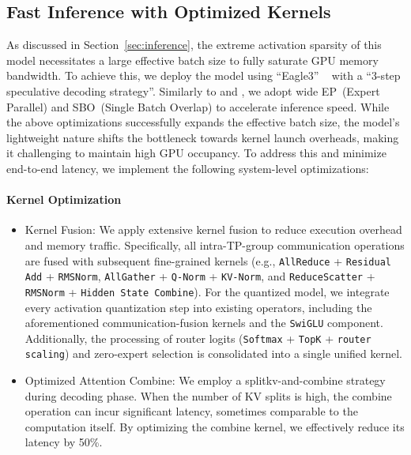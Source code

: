 \documentclass{article}
\begin{document}
\subsection{Fast Inference with Optimized Kernels}


As discussed in Section~\ref{sec:inference}, the extreme activation sparsity of this model necessitates a large effective batch size to fully saturate GPU memory bandwidth. To achieve this, we deploy the model using ``Eagle3'' ~\citep{li2025eagle3scalinginferenceacceleration} with a ``3-step speculative decoding strategy''. Similarly to \cite{qian2025epsmoeexpertpipelinescheduler} and \cite{meituanlongcatteam2025longcatflashtechnicalreport}, we adopt wide EP~(Expert Parallel) and SBO~(Single Batch Overlap) to accelerate inference speed. While the above optimizations successfully expands the effective batch size, the model's lightweight nature shifts the bottleneck towards kernel launch overheads, making it challenging to maintain high GPU occupancy. To address this and minimize end-to-end latency, we implement the following system-level optimizations:


\paragraph{Kernel Optimization}
    \begin{itemize}
        \item Kernel Fusion: We apply extensive kernel fusion to reduce execution overhead and memory traffic. Specifically, all intra-TP-group communication operations are fused with subsequent fine-grained kernels (e.g., \texttt{AllReduce} + \texttt{Residual Add} + \texttt{RMSNorm}, \texttt{AllGather} + \texttt{Q-Norm} + \texttt{KV-Norm}, and \texttt{ReduceScatter} + \texttt{RMSNorm} + \texttt{Hidden State Combine}). For the quantized model, we integrate every activation quantization step into existing operators, including the aforementioned communication-fusion kernels and the \texttt{SwiGLU} component. Additionally, the processing of router logits (\texttt{Softmax} + \texttt{TopK} + \texttt{router scaling}) and zero-expert selection is consolidated into a single unified kernel.
        \item Optimized Attention Combine: We employ a splitkv-and-combine strategy during decoding phase. When the number of KV splits is high, the combine operation can incur significant latency, sometimes comparable to the computation itself. By optimizing the combine kernel, we effectively reduce its latency by 50\%.
    \end{itemize}
\end{document}
